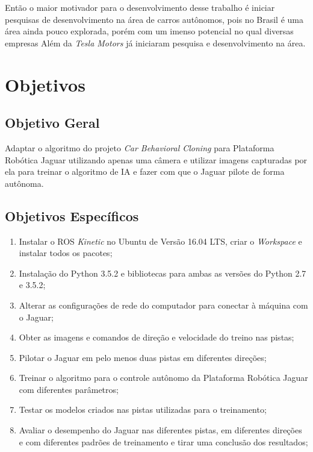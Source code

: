 Então o maior motivador para o desenvolvimento desse trabalho é iniciar pesquisas de desenvolvimento na área de carros autônomos, pois no Brasil é uma área ainda pouco explorada, porém com um imenso potencial no qual diversas empresas Além da \textit{Tesla Motors} \cite{empresasenvolvidascomcarrosautonomos} já iniciaram pesquisa e desenvolvimento na área.

\section{Objetivos}
\label{sec:objetivos}

\subsection{Objetivo Geral}
\label{sec:objetivo-geral}

Adaptar o algoritmo do projeto \textit{Car Behavioral Cloning} para Plataforma Robótica Jaguar utilizando apenas uma câmera e utilizar imagens capturadas por ela para treinar o algoritmo de \acrlong{IA} e fazer com que o Jaguar pilote de forma autônoma.


\subsection{Objetivos Específicos}
\label{sec:objetivos-especificos}

\begin{enumerate}
\item Instalar o ROS \textit{Kinetic} no Ubuntu de Versão 16.04 LTS, criar o \textit{Workspace} e instalar todos os pacotes;
\item Instalação do Python 3.5.2 e bibliotecas para ambas as versões do Python 2.7 e 3.5.2;
\item Alterar as configurações de rede do computador para conectar à máquina com o Jaguar;
\item Obter as imagens e comandos de direção e velocidade do treino nas pistas;
\item Pilotar o Jaguar em pelo menos duas pistas em diferentes direções;
\item Treinar o algoritmo para o controle autônomo da Plataforma Robótica Jaguar com diferentes parâmetros;
\item Testar os modelos criados nas pistas utilizadas para o treinamento;
\item Avaliar o desempenho do Jaguar nas diferentes pistas, em diferentes direções e com diferentes padrões de treinamento e tirar uma conclusão dos resultados;
\end{enumerate}





